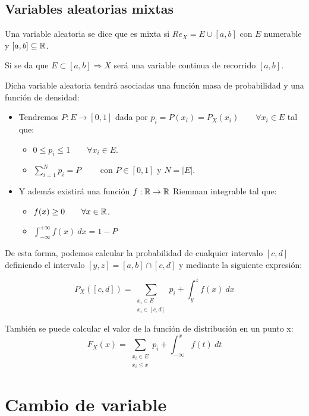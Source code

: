 \subsection{Variables aleatorias mixtas}

\begin{definicion}
    Una variable aleatoria se dice que es mixta si $Re_X = E \cup [a,b]$ con $E$ numerable y $[a,b]\subseteq \mathbb R$.
    
    Si se da que $E \subset [a,b] \Rightarrow X$ será una variable continua de recorrido $[a,b]$.
\end{definicion}

Dicha variable aleatoria tendrá asociadas una función masa de probabilidad y una función de densidad:
\begin{itemize}
    \item Tendremos $P:E\rightarrow [0,1]$ dada por $p_i = P(x_i) = P_X(x_i) \qquad \forall x_i \in E$ tal que:
    \begin{itemize}
      \item $0 \leq p_i \leq 1 \qquad \forall x_i \in E$.
      \item $\sum\limits_{i=1}^N p_i = P \qquad $ con $P\in [0,1]$ y $N=|E|$.
    \end{itemize}
    
    \item Y además existirá una función $f:\mathbb R \rightarrow \mathbb R$ Riemman integrable tal que:
    \begin{itemize}
      \item $f(x) \geq 0 \qquad \forall x \in \mathbb R$.
      \item $\displaystyle \int_{-\infty}^{+\infty} f(x)~dx = 1-P$
    \end{itemize}
\end{itemize}

\bigskip

De esta forma, podemos calcular la probabilidad de cualquier intervalo $[c,d]$ definiendo el intervalo $[y,z] = [a,b] \cap [c,d]$ y mediante la siguiente expresión:

$$P_X([c,d]) = \sum_{\substack{x_i \in E \\ x_i \in [c,d]}} p_i + \int_y^z f(x)~dx $$

También se puede calcular el valor de la función de distribución en un punto x:
$$F_X(x) = \sum_{\substack{x_i \in E \\ x_i \leq x}} p_i + \int_{-\infty}^x f(t)~dt$$

\section{Cambio de variable}


